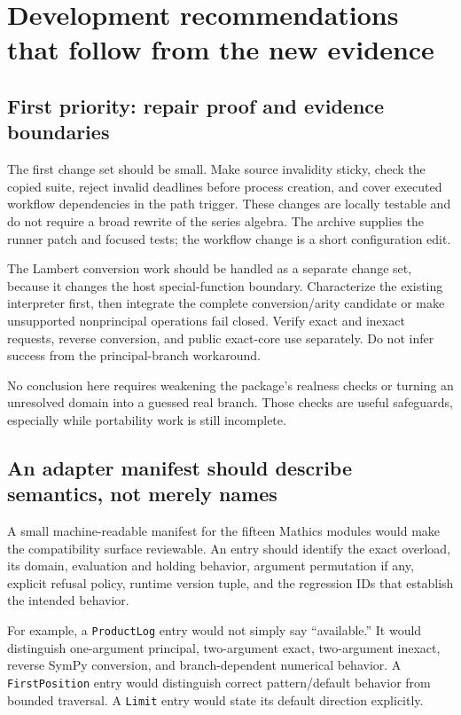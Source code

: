 \documentclass[11pt,a4paper]{article}
\newcommand{\code}[1]{\texttt{#1}}
\begin{document}
\section{Development recommendations that follow from the new evidence}
\subsection{First priority: repair proof and evidence boundaries}
The first change set should be small. Make source invalidity sticky, check the copied suite, reject invalid deadlines before process creation, and cover executed workflow dependencies in the path trigger. These changes are locally testable and do not require a broad rewrite of the series algebra. The archive supplies the runner patch and focused tests; the workflow change is a short configuration edit.

The Lambert conversion work should be handled as a separate change set, because it changes the host special-function boundary. Characterize the existing interpreter first, then integrate the complete conversion/arity candidate or make unsupported nonprincipal operations fail closed. Verify exact and inexact requests, reverse conversion, and public exact-core use separately. Do not infer success from the principal-branch workaround.

No conclusion here requires weakening the package's realness checks or turning an unresolved domain into a guessed real branch. Those checks are useful safeguards, especially while portability work is still incomplete.

\subsection{An adapter manifest should describe semantics, not merely names}
A small machine-readable manifest for the fifteen Mathics modules would make the compatibility surface reviewable. An entry should identify the exact overload, its domain, evaluation and holding behavior, argument permutation if any, explicit refusal policy, runtime version tuple, and the regression IDs that establish the intended behavior.

For example, a \code{ProductLog} entry would not simply say ``available.'' It would distinguish one-argument principal, two-argument exact, two-argument inexact, reverse SymPy conversion, and branch-dependent numerical behavior. A \code{FirstPosition} entry would distinguish correct pattern/default behavior from bounded traversal. A \code{Limit} entry would state its default direction explicitly.
\end{document}
